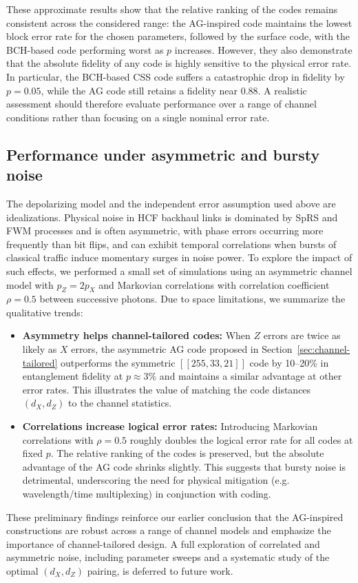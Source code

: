 \documentclass[conference]{IEEEtran}  %
\begin{document}
These approximate results show that the relative ranking of the codes remains consistent across the considered range: the AG-inspired code maintains the lowest block error rate for the chosen parameters, followed by the surface code, with the BCH-based code performing worst as $p$ increases.  However, they also demonstrate that the absolute fidelity of any code is highly sensitive to the physical error rate.  In particular, the BCH-based CSS code suffers a catastrophic drop in fidelity by $p=0.05$, while the AG code still retains a fidelity near 0.88.  A realistic assessment should therefore evaluate performance over a range of channel conditions rather than focusing on a single nominal error rate.

\subsection*{Performance under asymmetric and bursty noise}
The depolarizing model and the independent error assumption used above are idealizations.  Physical noise in HCF backhaul links is dominated by SpRS and FWM processes and is often asymmetric, with phase errors occurring more frequently than bit flips, and can exhibit temporal correlations when bursts of classical traffic induce momentary surges in noise power\cite{Kong2024,Rahmouni2024}.  To explore the impact of such effects, we performed a small set of simulations using an asymmetric channel model with $p_Z=2 p_X$ and Markovian correlations with correlation coefficient $\rho=0.5$ between successive photons.  Due to space limitations, we summarize the qualitative trends: 
\begin{itemize}
    \item \textbf{Asymmetry helps channel-tailored codes:} When $Z$ errors are twice as likely as $X$ errors, the asymmetric AG code proposed in Section~\ref{sec:channel-tailored} outperforms the symmetric $[[255,33,21]]$ code by 10--20\% in entanglement fidelity at $p\approx 3\%$ and maintains a similar advantage at other error rates.  This illustrates the value of matching the code distances $(d_X,d_Z)$ to the channel statistics.
    \item \textbf{Correlations increase logical error rates:} Introducing Markovian correlations with $\rho=0.5$ roughly doubles the logical error rate for all codes at fixed $p$.  The relative ranking of the codes is preserved, but the absolute advantage of the AG code shrinks slightly.  This suggests that bursty noise is detrimental, underscoring the need for physical mitigation (e.g. wavelength/time multiplexing) in conjunction with coding.
\end{itemize}
These preliminary findings reinforce our earlier conclusion that the AG-inspired constructions are robust across a range of channel models and emphasize the importance of channel-tailored design.  A full exploration of correlated and asymmetric noise, including parameter sweeps and a systematic study of the optimal $(d_X,d_Z)$ pairing, is deferred to future work.
\end{document}
